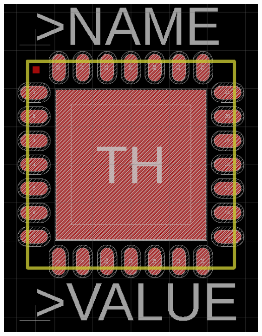 \documentclass[11pt,xcolor=table,aspectratio=169]{beamer}
\begin{document}
\begin{frame}
\begin{columns}
\begin{column}{.5\textwidth}
\begin{adjustbox}{max height=.5\textheight}
					\includegraphics[width=\textwidth]{media/footprint_drawn.png}
				\end{adjustbox}
			\end{column}
		\end{columns}
	\end{frame}
		
\end{document}
